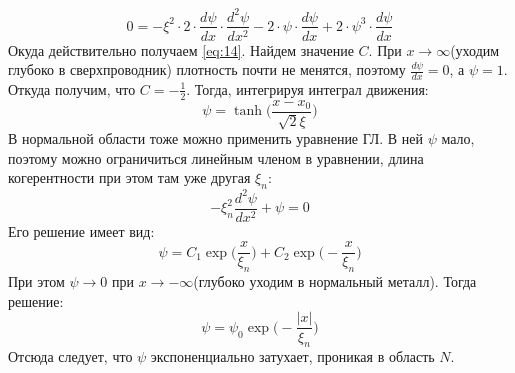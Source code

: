 \documentclass[a4paper]{article}
\begin{document}
$$0=-\xi^2\cdot2\cdot\frac{d\psi}{dx}\cdot\frac{d^2\psi}{dx^2}-2\cdot\psi\cdot\frac{d\psi}{dx}+2\cdot\psi^3\cdot\frac{d\psi}{dx}$$
Окуда действительно получаем \ref{eq:14}.
Найдем значение $C$. При $x\to\infty$(уходим глубоко в сверхпроводник) плотность почти не менятся, поэтому $\frac{d\psi}{dx}=0$, а $\psi=1$. Откуда получим, что $C=-\frac{1}{2}$.
Тогда, интегрируя интеграл движения:
\begin{equation} \label{eq:16}
\psi=\tanh\bigg(\frac{x-x_0}{\sqrt2 \xi}\bigg)
\end{equation}
В нормальной области тоже можно применить уравнение ГЛ. В ней $\psi$ мало, поэтому можно ограничиться линейным членом в уравнении, длина когерентности при этом там уже другая $\xi_n$:
\begin{equation} \label{eq:17}
-\xi_n^2\frac{d^2\psi}{dx^2}+\psi=0
\end{equation}
Его решение имеет вид:
\begin{equation} \label{eq:18}
\psi=C_1\exp\bigg({\frac{x}{\xi_n}}\bigg)+C_2\exp\bigg(-{\frac{x}{\xi_n}}\bigg)
\end{equation}
При этом $\psi\to0$ при $x\to-\infty$(глубоко уходим в нормальный металл). Тогда решение:
\begin{equation} \label{eq:19}
\psi=\psi_0\exp{\bigg(-\frac{|x|}{\xi_n}\bigg)}
\end{equation}
Отсюда следует, что $\psi$ экспоненциально затухает, проникая в область $N$.
\end{document}
